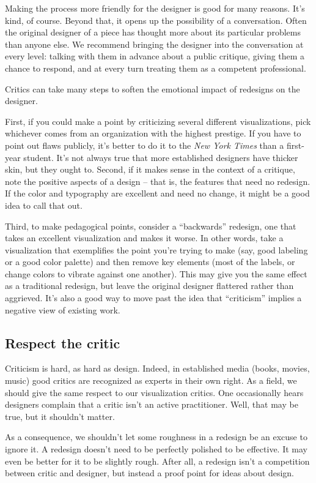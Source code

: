 \documentclass[sigconf,nonacm,screen,pbalance]{acmart}
\begin{document}
Making the process more friendly for the designer is good for
many reasons. It's kind, of course. Beyond that, it opens up the possibility of a
conversation. Often the original designer of a piece has thought more about its particular
problems than anyone else. We recommend bringing the designer into the conversation at
every level: talking with them in advance about a public critique, giving them a chance to
respond, and at every turn treating them as a competent professional.

Critics can take many steps to soften the emotional impact of
redesigns on the designer.

First, if you could make a point by criticizing several
different visualizations, pick whichever comes from an organization with the highest
prestige. If you have to point out flaws publicly, it's better to do it to the {\em New York Times} than a first-year student. It's not always true that more
established designers have thicker skin, but they ought to. Second, if it makes sense in
the context of a critique, note the positive aspects of a design -- that is, the features
that need no redesign. If the color and typography are excellent and need no change, it
might be a good idea to call that out.

Third, to make pedagogical points, consider a ``backwards''
redesign, one that takes an excellent visualization and makes it worse. In other words,
take a visualization that exemplifies the point you're trying to make (say, good labeling
or a good color palette) and then remove key elements (most of the labels, or change
colors to vibrate against one another). This may give you the same effect as a traditional
redesign, but leave the original designer flattered rather than aggrieved. It's also a
good way to move past the idea that ``criticism'' implies a negative view of existing work.


\subsection{Respect the critic}
Criticism is hard, as hard as design. Indeed, in established
media (books, movies, music) good critics are recognized as experts in their own right. As
a field, we should give the same respect to our visualization critics. One occasionally
hears designers complain that a critic isn't an active practitioner. Well, that may be
true, but it shouldn't matter.

As a consequence, we shouldn't let some roughness in a
redesign be an excuse to ignore it. A redesign doesn't need to be perfectly polished to be
effective. It may even be better for it to be slightly rough. After all, a redesign isn't
a competition between critic and designer, but instead a proof point for ideas about
design.
\end{document}
